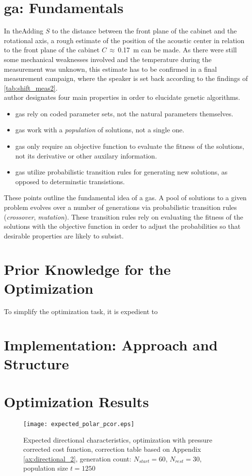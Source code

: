 \section{\gls{ga}: Fundamentals}
In \citep[p. 7]{goldberg89} theAdding \(S\) to the distance between the front plane of the cabinet and the rotational axis, a rough estimate of the position of the acoustic center in relation to the front plane of the cabinet \(C\,\approx\,\)\SI{0.17}{\meter} can be made. As there were still some mechanical weaknesses involved and the temperature during the measurement was unknown, this estimate has to be confirmed in a final measurement campaign, where the speaker is set back according to the findings of \autoref{tab:shift_meas2}.\\
 author designates four main properties in order to elucidate genetic algorithms. 
\begin{itemize}
\item \gls{ga}s rely on coded parameter sets, not the natural parameters themselves.
\item \gls{ga}s work with a \textit{population} of solutions, not a single one.
\item \gls{ga}s only require an objective function to evaluate the fitness of the solutions, not its derivative or other auxilary information.
\item \gls{ga}s utilize probabilistic transition rules for generating new solutions, as opposed to determinstic transistions.
\end{itemize}
These points outline the fundamental idea of a \gls{ga}s. A pool of solutions to a given problem evolves over a number of generations via probabilistic transition rules (\textit{crossover}, \textit{mutation}).
These transition rules rely on evaluating the fitness of the solutions with the objective function in order to adjust the probabilities so that desirable properties are likely to subsist.
\citep{genetic_survey}

\section{Prior Knowledge for the Optimization}
To simplify the optimization task, it is expedient to 

\section{Implementation: Approach and Structure}

\section{Optimization Results}\label{sec:opt_result}
\begin{figure}[H]
	\centering
	\texttt{[image: expected\_polar\_pcor.eps]}
	\caption{Expected directional characteristics, optimization with pressure corrected cost function, correction table based on Appendix \ref{ax:directional_2}, generation count: $N_{start}=60$, $N_{rest}=30$, population size $t=1250$}
		\label{fig:expected_pcor}
\end{figure}